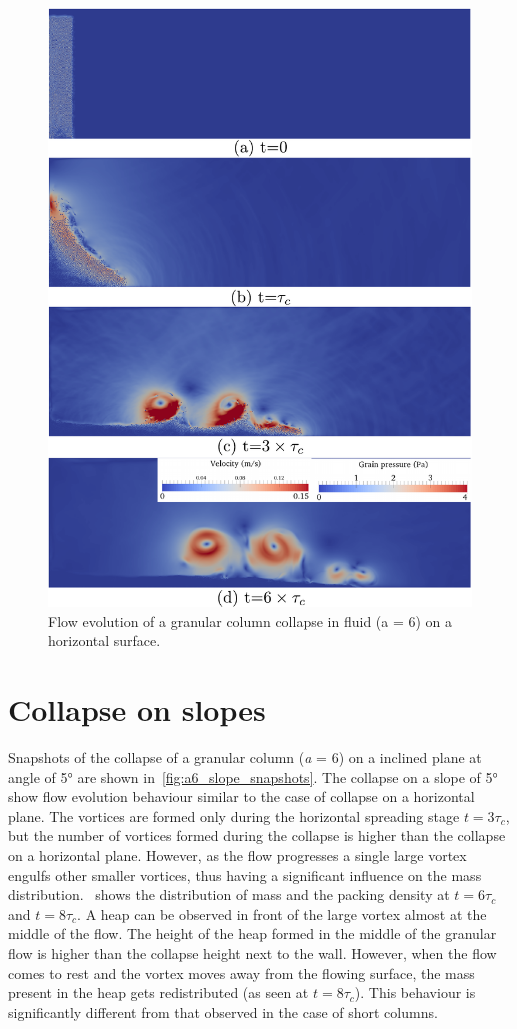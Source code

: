 \documentclass[epj,twocolumn]{webofc}
\begin{document}
\begin{figure}[htpb]
\centering
\includegraphics[width=0.9\linewidth]{figs/lbm_dem_a6}
\caption{Flow evolution of a granular column collapse in fluid (a = 6) on a 
horizontal surface.}
\label{fig:LBM_DEM_a6}
\end{figure}


\section{Collapse on slopes}
Snapshots of the collapse of a granular column (\textit{a} = 6) on a inclined 
plane at angle of 5\si{\degree} are shown in~\cref{fig:a6_slope_snapshots}. 
The collapse on a slope of 5\si{\degree} show flow evolution behaviour similar 
to the case of collapse on a horizontal plane. The vortices are formed only 
during the horizontal spreading stage $t = 3\tau_c$, but the number of vortices 
formed during the collapse is higher than the collapse on a horizontal plane. 
However, as the flow progresses a single large vortex engulfs other smaller 
vortices, thus having a significant influence on the mass 
distribution.~ shows 
the distribution of mass and the packing density at $t = 6\tau_c$ and $t = 
8\tau_c$. A heap can be observed in front of the large vortex almost at the 
middle of the flow. The height of the heap formed in the middle of the granular 
flow is higher than the collapse height next to the wall. However, when the 
flow comes to rest and the vortex moves 
away from the flowing surface, the mass present in the heap gets redistributed 
(as seen at $t = 8\tau_c$). This behaviour is significantly different from that 
observed in the case of short columns. 
\end{document}
